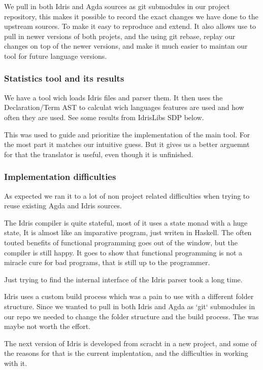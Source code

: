\documentclass[parskip=half]{scrartcl}
\begin{document}
We pull in both Idris and Agda sources as git submodules in our project
repository, this makes it possible to record the exact changes we have done to
the upstream sources. To make it easy to reproduce and extend. It also allows
use to pull in newer versions of both projets, and the using git rebase, replay
our changes on top of the newer versions, and make it much easier to maintan
our tool for future language versions.

\subsubsection{Statistics tool and its results}
We have a tool wich loads Idris files and parser them. It then uses the
Declaration/Term AST to calculat wich languages features are used and how often
they are used. See some results from IdrisLibs SDP below.

This was used to guide and prioritize the implementation of the main tool. For
the most part it matches our intuitive guess. But it gives us a better arguemnt
for that the translator is useful, even though it is unfinished.

\subsubsection{Implementation difficulties}
As expected we ran it to a lot of non project related difficulties when trying
to reuse existing Agda and Idris sources.

The Idris compiler is quite stateful, most of it uses a state monad with a huge
state, It is almost like an imparative program, just writen in Haskell. The
often touted benefits of functional programming goes out of the window, but the
compiler is still happy. It goes to show that functional programming is not
a miracle cure for bad programs, that is still up to the programmer.

Just trying to find the internal interface of the Idris parser took a long
time.

Idris uses a custom build process which was a pain to use with a different
folder structure. Since we wanted to pull in both Idris and Agda as `git`
submodules in our repo we needed to change the folder structure and the build
process. The was maybe not worth the effort.

The next version of Idris is developed from scracht in a new project, and some
of the reasons for that is the current implentation, and the difficulties in
working with it.
\end{document}
